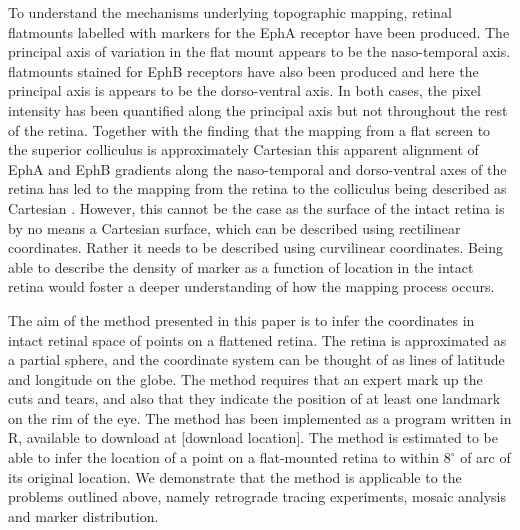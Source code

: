 \documentclass[10pt]{article}
\newcommand{\todo}[1]{{\color{red}[#1]}}
\begin{document}
To understand the mechanisms underlying topographic mapping, retinal
flatmounts labelled with markers for the EphA receptor
\cite{ChenEtal95comp} have been produced. The principal axis of
variation in the flat mount appears to be the naso-temporal axis.
flatmounts stained for EphB receptors have also been produced
\cite{BirgEtal00kina} and here the principal axis is appears to be the
dorso-ventral axis. In both cases, the pixel intensity has been
quantified along the principal axis but not throughout the rest of the
retina.  Together with the finding that the mapping from a flat screen
to the superior colliculus is approximately Cartesian
\cite{DragHube76topo} this apparent alignment of EphA and EphB
gradients along the naso-temporal and dorso-ventral axes of the retina
has led to the mapping from the retina to the colliculus being
described as Cartesian \cite{BeviEtal11gene}. However, this cannot be
the case as the surface of the intact retina is by no means a
Cartesian surface, which can be described using rectilinear
coordinates.  Rather it needs to be described using curvilinear
coordinates. Being able to describe the density of marker as a
function of location in the intact retina would foster a deeper
understanding of how the mapping process occurs.


The aim of the method presented in this paper is to infer the
coordinates in intact retinal space of points on a flattened
retina. The retina is approximated as a partial sphere, and the
coordinate system can be thought of as lines of latitude and longitude
on the globe.  The method requires that an expert mark up the cuts and
tears, and also that they indicate the position of at least one
landmark on the rim of the eye. The method has been implemented as a
program written in R, available to download at
\todo{download location}. The method is estimated to be able to infer
the location of a point on a flat-mounted retina to within $8^\circ$
of arc of its original location. We demonstrate that the method is
applicable to the problems outlined above, namely retrograde tracing
experiments, mosaic analysis and marker distribution.
\end{document}
